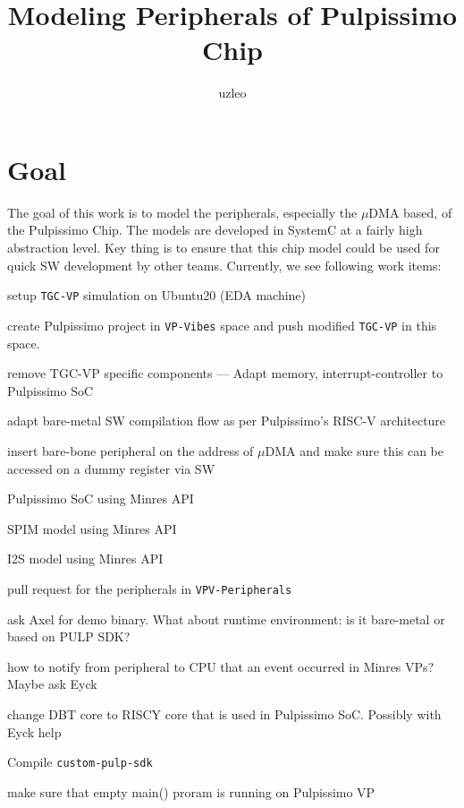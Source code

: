\documentclass{article}
\title{Modeling Peripherals of Pulpissimo Chip}
\author{uzleo}
\date{}
\newcommand{\cmark}{\ding{51}}%
\newcommand{\done}{\rlap{$\square$}{\raisebox{2pt}{\large\hspace{1pt}\cmark}}%
\hspace{-2.5pt}}
\begin{document}
\maketitle


\section{Goal}
The goal of this work is to model the peripherals, especially the $\mu$DMA based, of the Pulpissimo Chip.
The models are developed in SystemC at a fairly high abstraction level. Key thing is to ensure that this
chip model could be used for quick SW development by other teams. Currently, we see following work items:

\begin{todolist}
 \item[\done] setup \texttt{TGC-VP} simulation on Ubuntu20 (EDA machine)
 \item[\done] create Pulpissimo project in \texttt{VP-Vibes} space and push modified \texttt{TGC-VP} in this space.
 \item[\done] remove TGC-VP specific components --- Adapt memory, interrupt-controller to Pulpissimo SoC
 \item[\done] adapt bare-metal SW compilation flow as per Pulpissimo's RISC-V architecture
 \item[\done] insert bare-bone peripheral on the address of $\mu$DMA and make sure this can be accessed on a
 dummy register via SW
 \item[\done] Pulpissimo SoC using Minres API
 \item SPIM model using Minres API
 \item I2S model using Minres API
 \item[\done] pull request for the peripherals in \texttt{VPV-Peripherals}
 \item[\done] ask Axel for demo binary. What about runtime environment: is it bare-metal or based on PULP SDK?
 \item how to notify from peripheral to CPU that an event occurred in Minres VPs? Maybe ask Eyck
 \item change DBT core to RISCY core that is used in Pulpissimo SoC. Possibly with Eyck help
 \item[\done] Compile \texttt{custom-pulp-sdk}
 \item make sure that empty main() proram is running on Pulpissimo VP

\end{todolist}
\end{document}
